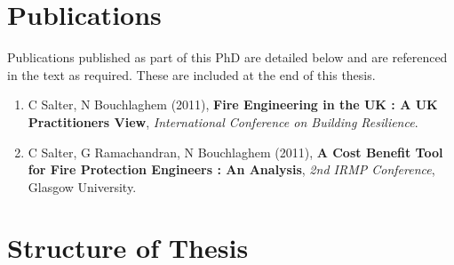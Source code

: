 \documentclass[table,a4paper,oneside]{book}
\begin{document}
\section{Publications}
\label{sec:Publications}

Publications published as part of this PhD are detailed below and are referenced in the text as required. These are included at the end of this thesis.

\begin{enumerate}
	\item C Salter, N Bouchlaghem (2011), \textbf{Fire Engineering in the UK : A UK Practitioners View}, \emph{International Conference on Building Resilience}.
	\item C Salter, G Ramachandran, N Bouchlaghem (2011), \textbf{A Cost Benefit Tool for Fire Protection Engineers : An Analysis}, \emph{2nd IRMP Conference}, Glasgow University.
\end{enumerate}

\section{Structure of Thesis}
\label{sec:Structure}

%
%
\end{document}
